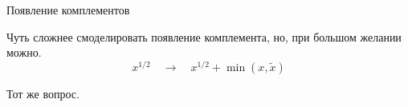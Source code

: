 \documentclass{beamer}
\begin{document}
\begin{frame}{Появление комплементов}

Чуть сложнее смоделировать появление комплемента, но, при большом желании можно.
$$ x^{1/2} \quad \to \quad x^{1/2} + \min(x, \tilde x)$$

Тот же вопрос.

\end{frame}


%

%
%
%
%
%
%
%
%
%
%
%
%
%
%
%
%
%
%
%
\end{document}
